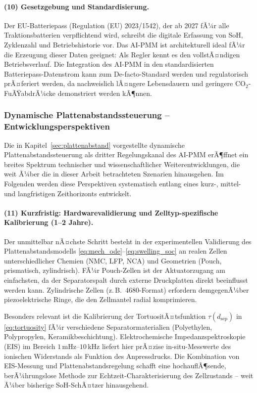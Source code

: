 ﻿\documentclass[12pt,a4paper]{article}
\begin{document}
	\paragraph{(10) Gesetzgebung und Standardisierung.}
	Der EU-Batteriepass (Regulation (EU) 2023/1542), der ab 2027 fÃ¼r alle
	Traktionsbatterien verpflichtend wird, schreibt die digitale Erfassung von
	SoH, Zyklenzahl und Betriebshistorie vor. Das AI-PMM ist architekturell
	ideal fÃ¼r die Erzeugung dieser Daten geeignet: Als Regler kennt es den
	vollstÃ¤ndigen Betriebsverlauf. Die Integration des AI-PMM in den
	standardisierten Batteriepass-Datenstrom kann zum De-facto-Standard
	werden und regulatorisch prÃ¤feriert werden, da nachweislich lÃ¤ngere
	Lebensdauern und geringere CO$_2$-FuÃŸabdrÃ¼cke demonstriert werden kÃ¶nnen.

\subsubsection{Dynamische Plattenabstandssteuerung -- Entwicklungsperspektiven}

Die in Kapitel~\ref{sec:plattenabstand} vorgestellte dynamische Plattenabstandssteuerung
als dritter Regelungskanal des AI-PMM erÃ¶ffnet ein breites Spektrum technischer
und wissenschaftlicher Weiterentwicklungen, die weit Ã¼ber die in dieser Arbeit
betrachteten Szenarien hinausgehen. Im Folgenden werden diese Perspektiven
systematisch entlang eines kurz-, mittel- und langfristigen Zeithorizonts
entwickelt.

\paragraph{(11) Kurzfristig: Hardwarevalidierung und Zelltyp-spezifische
	Kalibrierung (1--2 Jahre).}
Der unmittelbar nÃ¤chste Schritt besteht in der experimentellen Validierung
des Plattenabstandsmodells \eqref{eq:mech_ode}--\eqref{eq:swelling_soc}
an realen Zellen unterschiedlicher Chemien (NMC, LFP, NCA) und Geometrien
(Pouch, prismatisch, zylindrisch). FÃ¼r Pouch-Zellen ist der Aktuatorzugang
am einfachsten, da der Separatorspalt durch externe Druckplatten direkt
beeinflusst werden kann. Zylindrische Zellen (z.\,B.\ 4680-Format) erfordern
demgegenÃ¼ber piezoelektrische Ringe, die den Zellmantel radial komprimieren.

Besonders relevant ist die Kalibrierung der TortuositÃ¤tsfunktion
$\tau(d_\mathrm{sep})$ in \eqref{eq:tortuosity} fÃ¼r verschiedene Separatormaterialien
(Polyethylen, Polypropylen, Keramikbeschichtung). Elektrochemische
Impedanzspektroskopie (EIS) im Bereich $1\,\mathrm{mHz}\text{--}10\,\mathrm{kHz}$
liefert hier prÃ¤zise in-situ-Messwerte des ionischen Widerstands als Funktion
des Anpressdrucks. Die Kombination von EIS-Messung und Plattenabstandsregelung
schafft eine hochauflÃ¶sende, berÃ¼hrungslose Methode zur Echtzeit-Charakterisierung
des Zellzustands -- weit Ã¼ber bisherige SoH-SchÃ¤tzer hinausgehend.
\end{document}
